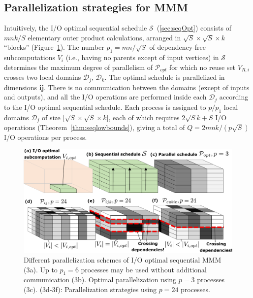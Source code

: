 \documentclass[sigplan,review,anonymous,10pt]{acmart}\settopmatter{printfolios=true,printccs=false,printacmref=false}
\begin{document}
\subsection{Parallelization strategies for MMM}
\label{sec:parStrategies}

Intuitively, the 
I/O optimal sequential schedule $\mathcal{S}$~(\cref{sec:seqOpt})
consists of $mnk/S$ elementary outer product calculations, arranged in
$\sqrt{S} \times \sqrt{S} \times k$ ``blocks'' 
(Figure~\ref{fig:mmmParallelization}). The number $p_1 = mn/\sqrt{S}$ of 
dependency-free subcomputations 
$V_i$
(i.e., having no parents except of input vertices) in 
$\mathcal{S}$ 
determines the maximum 
degree 
of parallelism of $\mathcal{P}_{opt}$ for which no reuse set $V_{R,i}$ crosses 
two local 
domains 
$\mathcal{D}_j$, $\mathcal{D}_k$. The optimal schedule 
is parallelized in dimensions \textbf{ij}. There is no communication between 
the 
domains (except of inputs and outputs), and all the I/O operations are 
performed inside each $\mathcal{D}_j$ according to the I/O optimal sequential 
schedule. Each process is  assigned to $p/p_1$ local domains
$\mathcal{D}_j$ of size 
$\big[\sqrt{S} \times \sqrt{S} \times k\big]$, each of which requires 
$2\sqrt{S}k + S$ I/O 
operations (Theorem~\ref{thm:seqlowbounds}), giving a total of $Q = 
2mnk/(p\sqrt{S})$ I/O operations per process.


\begin{figure}
	\includegraphics[width=\columnwidth]{figures/mmm_parallelization}
	\caption{Different parallelization schemes of I/O optimal sequential MMM 
	(3a). 
	Up to $p_1 = 6$ processes may 
		be 
		used without additional communication (3b). 
		Optimal 
		parallelization using $p=3$ processes (3c). 
		(3d-3f):  Parallelization strategies 
		using $p=24$ processes.} 
	\label{fig:mmmParallelization}
\end{figure}
\end{document}
